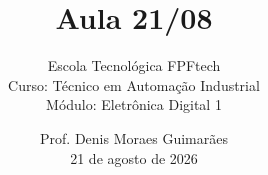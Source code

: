 
\title{Aula 21/08}

\subtitle{
\vspace{1.0cm}
Escola Tecnológica FPFtech\\
\vspace{0.5cm}
Curso: Técnico em Automação Industrial\\
\vspace{0.5cm}
Módulo: Eletrônica Digital 1
\vspace{1.0cm}
}

\author{
Prof. Denis Moraes Guimarães\\
\small 21 de agosto de 2026
}

\date{}